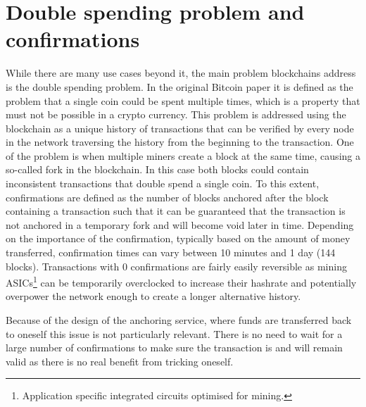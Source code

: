 \documentclass[12pt,msc,a4paper,oneside]{ucl_thesis}
\begin{document}
\section{Double spending problem and confirmations}
While there are many use cases beyond it, the main problem blockchains address is the double spending problem. In the original Bitcoin paper it is defined as the problem that a single coin could be spent multiple times, which is a property that must not be possible in a crypto currency. This problem is addressed using the blockchain as a unique history of transactions that can be verified by every node in the network traversing the history from the beginning to the transaction. One of the problem is when multiple miners create a block at the same time, causing a so-called fork in the blockchain. In this case both blocks could contain inconsistent transactions that double spend a single coin. To this extent, confirmations are defined as the number of blocks anchored after the block containing a transaction such that it can be guaranteed that the transaction is not anchored in a temporary fork and will become void later in time. Depending on the importance of the confirmation, typically based on the amount of money transferred, confirmation times can vary between 10 minutes and 1 day (144 blocks). Transactions with 0 confirmations are fairly easily reversible as mining ASICs\footnote{Application specific integrated circuits optimised for mining.} can be temporarily overclocked to increase their hashrate and potentially overpower the network enough to create a longer alternative history.

Because of the design of the anchoring service, where funds are transferred back to oneself this issue is not particularly relevant. There is no need to wait for a large number of confirmations to make sure the transaction is and will remain valid as there is no real benefit from tricking oneself.
\end{document}
